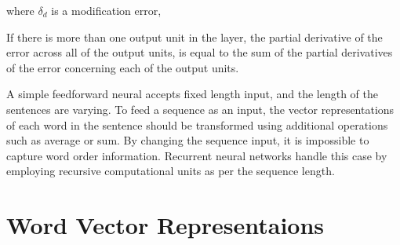 \documentclass[12pt]{report} %
\begin{document}
where $\delta_{d}$ is a modification error,

%    

If there is more than one output unit in the layer, the partial derivative of the error across all of the output units, is equal to the sum of the partial derivatives of the error concerning each of the output units.

A simple feedforward neural accepts fixed length input, and the length of the sentences are varying. To feed a sequence as an input, the vector representations of each word in the sentence should be transformed using additional operations such as average or sum. By changing the sequence input, it is impossible to capture word order information. Recurrent neural networks handle this case by employing recursive computational units as per the sequence length.

\section{Word Vector Representaions}
\end{document}
